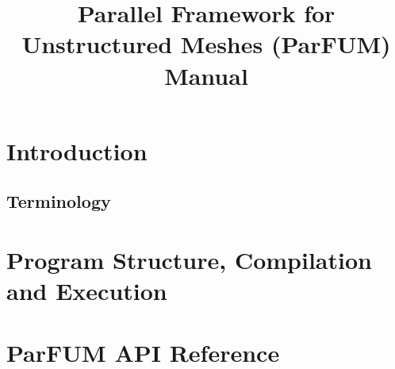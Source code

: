 \documentclass[10pt]{article}
\title{Parallel Framework for Unstructured Meshes (ParFUM) Manual}
\begin{document}
\maketitle

\section{Introduction}
\label{sec:intro}


\subsection{Terminology}
\label{sec:terminology}


\section{Program Structure, Compilation and Execution}
\label{sec:program}


\section{ParFUM API Reference}
\label{sec:api}



\end{document}
